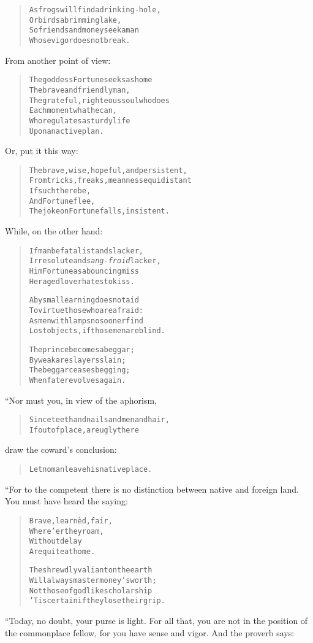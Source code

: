 \documentclass[article, twoside, 14pt]{memoir}
\renewenvironment{verbatim}{%
\begin{quote}%
\vskip -10pt%
\begin{alltt}\normalfont\large}{\end{alltt}%
\end{quote}%
\vskip -10pt
} %
\begin{document}
\begin{verbatim}
As frogs will find a drinking-hole,
    Or birds a brimming lake,
So friends and money seek a man
    Whose vigor does not break.
\end{verbatim}
From another point of view:

\begin{verbatim}
The goddess Fortune seeks as home
    The brave and friendly man,
The grateful, righteous soul who does
    Each moment what he can,
Who regulates a sturdy life
    Upon an active plan.
\end{verbatim}
Or, put it this way:

\begin{verbatim}
The brave, wise, hopeful, and persistent,
From tricks, freaks, meanness equidistant{\textemdash}
    If such there be,
    And Fortune flee,
The joke on Fortune falls, insistent.
\end{verbatim}
While, on the other hand:

\begin{verbatim}
If man be fatalist and slacker,
Irresolute and \emph{sang-froid} lacker,
Him Fortune{\textemdash}as a bouncing miss
Her aged lover{\textemdash}hates to kiss.

Abysmal learning does not aid
To virtue those who are afraid:
As men with lamps no sooner find
Lost objects, if those men are blind.

The prince becomes a beggar;
    By weak are slayers slain;
The beggar ceases begging;
    When fate revolves again.
\end{verbatim}
“Nor must you, in view of the aphorism,

\begin{verbatim}
Since teeth and nails and men and hair,
If out of place, are ugly there
\end{verbatim}
draw the coward's conclusion:

\begin{verbatim}
Let no man leave his native place.
\end{verbatim}
“For to the competent there is no distinction between native and
foreign land. You must have heard the saying:

\begin{verbatim}
Brave, learnèd, fair,
    Where'er they roam,
Without delay
    Are quite at home.

The shrewdly valiant on the earth
Will always master money's worth;
Not those of godlike scholarship{\textemdash}
'Tis certain{\textemdash}if they lose their grip.
\end{verbatim}
“Today, no doubt, your purse is light. For all that, you are not in
the position of the commonplace fellow, for you have sense and
vigor. And the proverb says:
\end{document}
